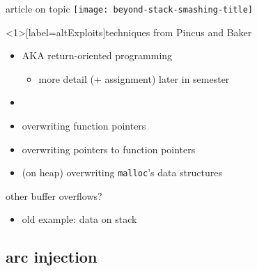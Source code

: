\begin{frame}{article on topic}
    \texttt{[image: beyond-stack-smashing-title]}
\end{frame}

\begin{frame}<1>[label=altExploits]{techniques from Pincus and Baker}
\begin{itemize}
\item {} AKA return-oriented programming
    \begin{itemize}
    \item more detail (+ assignment) later in semester
    \end{itemize}
\item {}
\item overwriting function pointers
\item overwriting pointers to function pointers
\item (on heap) overwriting {\tt malloc}'s data structures
\end{itemize}
\end{frame}

\begin{frame}{other buffer overflows?}
    \begin{itemize}
        \item old example: data on stack
    \end{itemize}
\end{frame}


\subsection{arc injection}

